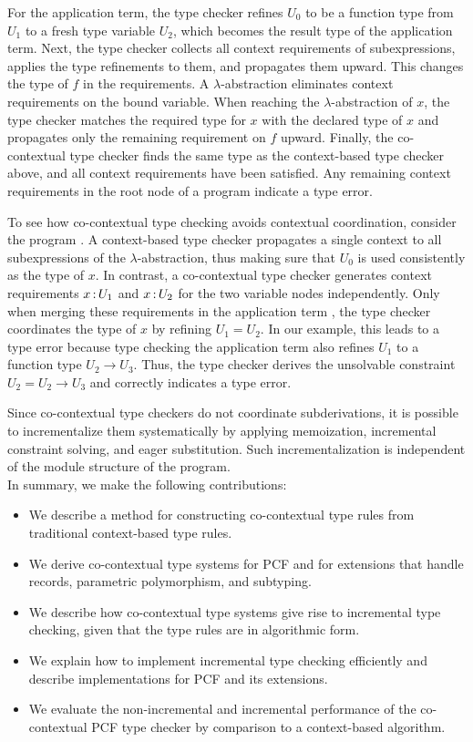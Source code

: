 \documentclass{llncs}
\begin{document}
For the application term, the type checker refines $U_0$ to be a function type
from $U_1$ to a fresh type variable $U_2$, which becomes the result type of the
application term. Next, the type checker collects all context requirements of
subexpressions, applies the type refinements to them, and propagates them
upward. This changes the type of $f$ in the requirements. A
$\lambda$-abstraction eliminates context requirements on the bound
variable. When reaching the $\lambda$-abstraction of $x$, the type checker
matches the required type for $x$ with the declared type of $x$ and 
propagates only the remaining requirement on $f$ upward. Finally,
the co-contextual type checker finds the same type as the context-based type
checker above, and all context requirements have been satisfied. Any remaining
context requirements in the root node of a program indicate a type error.

To see how co-contextual type checking avoids contextual coordination, consider
the program . A context-based type checker propagates a
single context  to all subexpressions of the
$\lambda$-abstraction, thus making sure that $U_0$ is used consistently as the type
of $x$. In contrast, a co-contextual type checker generates context requirements
$x \mathop{:} U_1$ and $x \mathop{:} U_2$ for the two variable nodes
independently. Only when merging these requirements in the application term
, the type checker coordinates the type of $x$ by refining $U_1 =
U_2$. In our example, this leads to a type error because type checking
the application term also refines $U_1$ to a function type $U_2 \to U_3$. Thus,
the type checker derives the unsolvable constraint $U_2 = U_2 \to U_3$ and
correctly indicates a type error.

Since co-contextual type checkers do not coordinate subderivations, it is
possible to incrementalize them systematically by applying memoization,
incremental constraint solving, and eager substitution. Such incrementalization
is independent of the module structure of the program. \\

\noindent
In summary, we make the
following contributions:

\begin{itemize}
\item We describe a method for constructing co-contextual type rules from
  traditional context-based type rules.
\item We derive co-contextual type systems for PCF and for extensions that
  handle records, parametric polymorphism, and subtyping.
\item We describe how co-contextual type systems give rise to incremental type
  checking, given that the type rules are in algorithmic form.
\item We explain how to implement incremental type checking efficiently and
  describe implementations for PCF and its extensions.
\item We evaluate the non-incremental and incremental performance of the
  co-contextual PCF type checker by comparison to a context-based algorithm.
\end{itemize}
\end{document}
